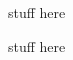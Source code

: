 \begin{minipage}{0.4\textwidth}
    stuff here
\end{minipage}
\hfill\vline\hfill
\begin{minipage}{0.4\textwidth}
    stuff here
\end{minipage}
